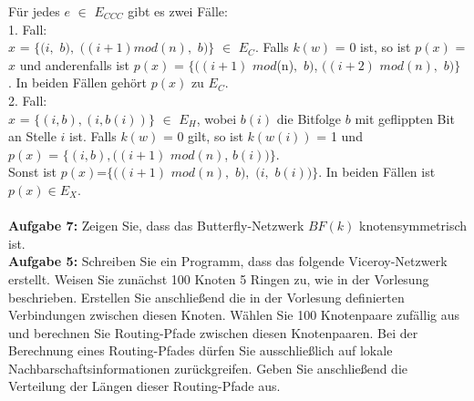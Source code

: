 \documentclass[12pt,a4paper]{report}
\begin{document}
Für jedes $e$ $\in$ $E_{CCC}$ gibt es zwei Fälle:\\
1. Fall:\\
$x$ = $\{(i,$ $b),$ $((i + 1)mod(n),$ $b)\}$ $\in$ $E_{C}$. Falls $k(w)$ = 0 ist, so ist $p(x)$ = $x$ und anderenfalls ist 
$p(x)$ = $\{((i + 1)$ $mod$(n)$,$ $b)$, $((i + 2)$ $mod(n),$ $b)\}$ . In beiden Fällen gehört $p(x)$ zu $E_{C}$.\\
2. Fall: \\
$x$ = $\{(i, b), (i, b(i))\}$ $\in$ $E_H$, wobei $b(i)$ die Bitfolge $b$ mit geflippten Bit an Stelle $i$ ist. Falls $k(w)$ = 0 gilt, so ist $k(w(i))$ = 1 und \\
$p(x)$ = $\{(i, b), ((i + 1)$ $mod(n)$, $b(i))\}$. \\
Sonst ist $p(x)$=$\{((i + 1)$ $mod(n),$ $b),$ $(i,$ $b(i))\}$. In beiden Fällen ist $p(x)\in E_X$. \\
\\
\textbf{Aufgabe 7:}
Zeigen Sie, dass das Butterfly-Netzwerk $BF(k)$ knotensymmetrisch ist.
\\
\textbf{Aufgabe 5:}
Schreiben Sie ein Programm, dass das folgende Viceroy-Netzwerk
erstellt. Weisen Sie zunächst 100 Knoten 5 Ringen zu, wie in der Vorlesung
beschrieben. Erstellen Sie anschließend die in der Vorlesung definierten
Verbindungen zwischen diesen Knoten. Wählen Sie 100 Knotenpaare
zufällig aus und berechnen Sie Routing-Pfade zwischen diesen Knotenpaaren.
Bei der Berechnung eines Routing-Pfades dürfen Sie ausschließlich auf
lokale Nachbarschaftsinformationen zurückgreifen. Geben Sie anschließend
die Verteilung der Längen dieser Routing-Pfade aus.
\end{document}
